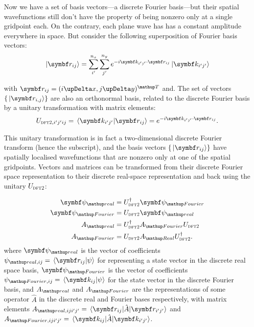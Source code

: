 Now we have a set of basis vectors---a discrete Fourier basis---but their spatial wavefunctions still don't have the property of being nonzero only at a single gridpoint each. On the contrary, each plane wave has has a constant amplitude everywhere in space. But consider the following superposition of Fourier basis vectors:
\begin{align}\label{eq:DFT_basischange}
\ket{\vec r_{ij}} = \sum_{i^\prime}^{n_x}\sum_{j^\prime}^{n_y} e^{-i \vec k_{i^\prime j^\prime} \cdot \vec r_{i j}}\ket{\vec k_{i^\prime j^\prime}}
\end{align}

with $\vec r_{i j} = (i \upDelta x, j \upDelta y)^\up{T}$ and. The set of vectors $\{\ket{\vec r_{i, j}}\}$ are also an orthonormal basis, related to the discrete Fourier basis by a unitary transformation with matrix elements:
\begin{align}
U_{\textsc{dft2}, i^\prime j^\prime ij} = \braket{\vec k_{i^\prime j^\prime}}{\vec r_{i j}} = e^{-i \vec k_{i^\prime j^\prime} \cdot \vec r_{i j}}.
\end{align}

This unitary transformation is in fact a two-dimensional discrete Fourier transform (hence the subscript), and the basis vectors $\{\ket{\vec r_{ij}}\}$ have spatially localised wavefunctions that are nonzero only at one of the spatial gridpoints. Vectors and matrices can be transformed from their discrete Fourier space representation to their discrete real-space representation and back using the unitary $U_{\textsc{dft2}}$:

\begin{align}
\vec\psi_\up{real} &= U^\dagger_{\textsc{dft2}} \vec \psi_\up{Fourier}\\
\vec\psi_\up{Fourier} &= U_{\textsc{dft2}} \vec \psi_\up{real}\\
A_\up{real} &= U^\dagger_{\textsc{dft2}} A_\up{Fourier} U_{\textsc{dft2}}\\
A_\up{Fourier} &= U_{\textsc{dft2}} A_\up{Real} U^\dagger_{\textsc{dft2}}.
\end{align}
where $\vec\psi_\up{real}$ is the vector of coefficients $\psi_{\up{real},ij}= \braket{\vec r_{ij}}{\psi}$ for representing a state vector in the discrete real space basis, $\vec\psi_\up{Fourier}$ is the vector of coefficients $\psi_{\up{Fourier}, ij} = \braket{\vec k_{ij}}{\psi}$ for the state vector in the discrete Fourier basis, and $A_\up{real}$ and $A_\up{Fourier}$ are the representations of some operator $\hat A$ in the discrete real and Fourier bases respectively, with matrix elements $A_{\up{real}, ij i^\prime j^\prime} = \matrixel{\vec r_{ij}}{\hat A}{\vec r_{i^\prime j^\prime}}$ and $A_{\up{Fourier},ij i^\prime j^\prime} = \matrixel{\vec k_{ij}}{\hat A}{\vec k_{i^\prime j^\prime}}$.

